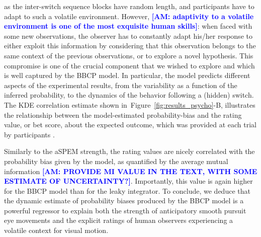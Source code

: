 \documentclass[12pt,english]{article}%
\newcommand{\seeFig}[1]{Figure~\ref{fig:#1}}
\newcommand{\AM}[1]{\textbf{\textcolor{blue}{[AM: #1]}}}
\begin{document}
as the inter-switch sequence blocks have random length,
and participants have to adapt to such a volatile environment.
However, \AM{adaptivity to a volatile environment is one of the most exquisite human skills}: when faced with some new observations,
the observer has to constantly adapt his/her response
to either exploit this information by considering that
this observation belongs to the same context of the previous observations, or to explore
a novel hypothesis.
This compromise is one of the crucial component that we wished to explore
and which is well captured by the BBCP model.
In particular, the model predicts different aspects
of the experimental results,
from the variability as a function of the inferred probability,
to the dynamics of the behavior following a (hidden) switch.
The KDE correlation estimate shown in~\seeFig{results_psycho}-B,
illustrates the relationship between
the model-estimated probability-bias
and the rating value, or bet score, about the expected outcome, which was provided at each trial
by participants .

Similarly to the aSPEM strength, the rating values are nicely correlated
with the probability bias given by the model, as quantified by the average  mutual information \AM{PROVIDE MI VALUE IN THE TEXT, WITH SOME ESTIMATE OF UNCERTAINTY?}.
Importantly, this value is again higher for the BBCP model than
for the leaky integrator.
To conclude, we deduce that the dynamic estimate of probability biases produced by the BBCP model
is a powerful regressor to explain both the strength of anticipatory smooth pursuit eye movements and the explicit ratings of human observers experiencing a volatile context for visual motion.
\end{document}
